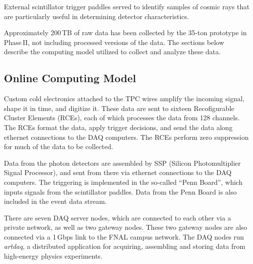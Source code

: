 \noindent
External scintillator trigger paddles 
served to identify samples of cosmic rays that are particularly useful in determining
detector characteristics.


Approximately 200\,TB of raw data has been collected by the 35-ton prototype in Phase\,II, not including processed versions of the data.
The sections below describe the computing model utilized to collect and analyze these data.

\subsection{Online Computing Model}

Custom cold electronics attached to the TPC wires amplify the incoming signal, shape it in time,
and digitize it.  These data are sent to sixteen Recofigurable Cluster Elements (RCEs), each of which
processes the data from 128 channels.  The RCEs format the data, apply trigger decisions, and send the
data along ethernet connections to the DAQ computers.  The RCEs perform zero suppression for
much of the data to be collected.

Data from the photon detectors are assembled by SSP (Silicon Photomultiplier Signal Processor),
and sent from there via ethernet connections to the DAQ computers.  The triggering is implemented
in the so-called ``Penn Board'', which inputs signals from the scintillator paddles.  Data
from the Penn Board is also included in the event data stream.

There are seven DAQ server nodes, which are connected to each other via a private network, as well as two gateway nodes. 
These two gateway nodes are also connected via a 1\,Gbps link to the FNAL campus network. The DAQ nodes run {\it artdaq},
a distributed application for acquiring, assembling and storing data from high-energy physics experiments. 

